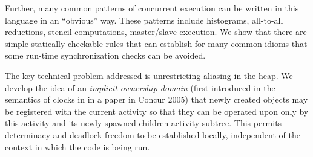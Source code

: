 Further, many common patterns of concurrent execution can be written
in this language in an ``obvious'' way. These patterns include
histograms, all-to-all reductions, stencil computations, master/slave
execution.  We show that there are simple statically-checkable rules
that can establish for many common idioms that some run-time
synchronization checks can be avoided.

The key technical problem addressed is unrestricting aliasing in the
heap.  We develop the idea of an {\em implicit ownership domain}
(first introduced in the semantics of clocks in \Xten{} in a paper in
Concur 2005) that newly created objects may be registered with the
current activity so that they can be operated upon only by this
activity and its newly spawned children activity subtree.  This
permits determinacy and deadlock freedom to be established locally,
independent of the context in which the code is being run.
